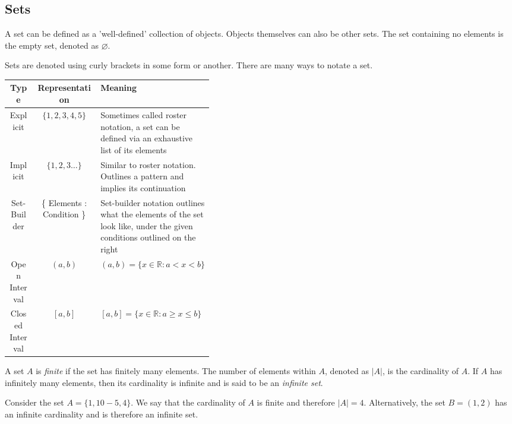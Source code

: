 \documentclass[../notes.tex]{subfiles}
\begin{document}

\subsection{Sets}

\begin{definition}[Sets]
	\label{def:sets}
	A set can be defined as a 'well-defined' collection of objects. Objects themselves can also be other sets. The set containing no elements is the empty set, denoted as $\varnothing$.
\end{definition}

Sets are denoted using curly brackets in some form or another. There are many ways to notate a set.

\begin{table}[h!]
	\centering
	\begin{tabular}{|c | c | p{0.4\linewidth}|}\hline
		\textbf{Type} & \textbf{Representation} & \textbf{Meaning} \\\hline
		Explicit & $\{1,2,3,4,5\}$ & Sometimes called roster notation, a set can be defined via an exhaustive list of its elements \\\hline
		Implicit & $\{1,2,3\ldots\}$ & Similar to roster notation. Outlines a pattern and implies its continuation \\\hline
		Set-Builder & \{ Elements \::\: Condition \} & Set-builder notation outlines what the elements of the set look like, under the given conditions outlined on the right \\\hline
		Open Interval & $(a,b)$ & $(a,b) = \{ x \in \mathbb{R} : a < x < b \}$ \\\hline
		Closed Interval & $[a,b]$ & $[a,b] = \{ x \in \mathbb{R} : a \geq x \leq b \}$ \\\hline
	\end{tabular}
\end{table}

\begin{definition}[Cardinality]
	\label{def:cardinality}
	A set $A$ is \textit{finite} if the set has finitely many elements. The number of elements within $A$, denoted as $|A|$, is the cardinality of $A$. If $A$ has infinitely many elements, then its cardinality is infinite and is said to be an \textit{infinite set}.
\end{definition}

Consider the set $A = \{1, 10 -5 ,4\}$. We say that the cardinality of $A$ is finite and therefore $|A| = 4$. Alternatively, the set $B = (1,2)$ has an infinite cardinality and is therefore an infinite set.
\end{document}

